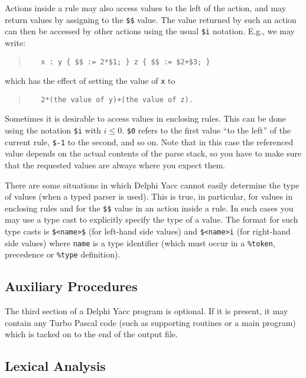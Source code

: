 \documentclass{article}
\begin{document}
Actions inside a rule may also access values to the left of the action,
and may return values by assigning to the \verb"$$" value. The value returned
by such an action can then be accessed by other actions using the usual
\verb"$i" notation. E.g., we may write:
\begin{quote}\begin{verbatim}
   x : y { $$ := 2*$1; } z { $$ := $2+$3; }
\end{verbatim}\end{quote}
which has the effect of setting the value of \verb"x" to
\begin{quote}\begin{verbatim}
   2*(the value of y)+(the value of z).
\end{verbatim}\end{quote}

Sometimes it is desirable to access values in enclosing rules. This can be
done using the notation \verb"$i" with $i\leq 0$. \verb"$0" refers to the
first value ``to the left'' of the current rule, \verb"$-1" to the second,
and so on. Note that in this case the referenced value depends on the actual
contents of the parse stack, so you have to make sure that the requested
values are always where you expect them.

There are some situations in which Delphi Yacc cannot easily determine the
type of values (when a typed parser is used). This is true, in particular,
for values in enclosing rules and for the \verb"$$" value in an action inside
a rule. In such cases you may use a type cast to explicitly specify the type
of a value. The format for such type casts is \verb"$<name>$" (for left-hand
side values) and \verb"$<name>i" (for right-hand side values) where
\verb"name" is a type identifier (which must occur in a \verb"%token",
precedence or \verb"%type" definition).

\subsection{Auxiliary Procedures}

The third section of a Delphi Yacc program is optional. If it is present, it
may contain any Turbo Pascal code (such as supporting routines or a main
program) which is tacked on to the end of the output file.

\subsection{Lexical Analysis}
\end{document}
